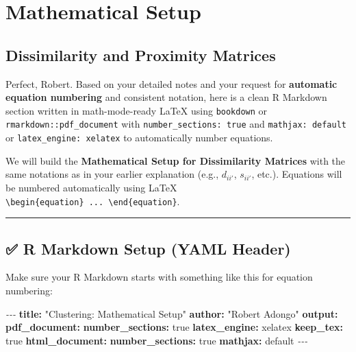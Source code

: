 \documentclass[
]{article}
\newenvironment{Shaded}{\begin{snugshade}}{\end{snugshade}}
\newcommand{\AttributeTok}[1]{\textcolor[rgb]{0.13,0.29,0.53}{#1}}
\newcommand{\CharTok}[1]{\textcolor[rgb]{0.31,0.60,0.02}{#1}}
\newcommand{\FunctionTok}[1]{\textcolor[rgb]{0.13,0.29,0.53}{\textbf{#1}}}
\newcommand{\KeywordTok}[1]{\textcolor[rgb]{0.13,0.29,0.53}{\textbf{#1}}}
\newcommand{\PreprocessorTok}[1]{\textcolor[rgb]{0.56,0.35,0.01}{\textit{#1}}}
\newcommand{\StringTok}[1]{\textcolor[rgb]{0.31,0.60,0.02}{#1}}
\begin{document}
\hypertarget{mathematical-setup}{%
\section{Mathematical Setup}\label{mathematical-setup}}

\hypertarget{dissimilarity-and-proximity-matrices}{%
\subsection{Dissimilarity and Proximity
Matrices}\label{dissimilarity-and-proximity-matrices}}

Perfect, Robert. Based on your detailed notes and your request for
\textbf{automatic equation numbering} and consistent notation, here is a
clean R Markdown section written in math-mode-ready LaTeX using
\texttt{bookdown} or \texttt{rmarkdown::pdf\_document} with
\texttt{number\_sections:\ true} and \texttt{mathjax:\ default} or
\texttt{latex\_engine:\ xelatex} to automatically number equations.

We will build the \textbf{Mathematical Setup for Dissimilarity Matrices}
with the same notations as in your earlier explanation (e.g.,
\(d_{ii'}\), \(s_{ii'}\), etc.). Equations will be numbered
automatically using LaTeX
\texttt{\textbackslash{}begin\{equation\}\ ...\ \textbackslash{}end\{equation\}}.

\begin{center}\rule{0.5\linewidth}{0.5pt}\end{center}

\hypertarget{r-markdown-setup-yaml-header}{%
\subsection{✅ R Markdown Setup (YAML
Header)}\label{r-markdown-setup-yaml-header}}

Make sure your R Markdown starts with something like this for equation
numbering:

\begin{Shaded}
\begin{Highlighting}[]
\PreprocessorTok{{-}{-}{-}}
\FunctionTok{title}\KeywordTok{:}\AttributeTok{ }\StringTok{"Clustering: Mathematical Setup"}
\FunctionTok{author}\KeywordTok{:}\AttributeTok{ }\StringTok{"Robert Adongo"}
\FunctionTok{output}\KeywordTok{:}
\AttributeTok{  }\FunctionTok{pdf\_document}\KeywordTok{:}
\AttributeTok{    }\FunctionTok{number\_sections}\KeywordTok{:}\AttributeTok{ }\CharTok{true}
\AttributeTok{    }\FunctionTok{latex\_engine}\KeywordTok{:}\AttributeTok{ xelatex}
\AttributeTok{    }\FunctionTok{keep\_tex}\KeywordTok{:}\AttributeTok{ }\CharTok{true}
\AttributeTok{  }\FunctionTok{html\_document}\KeywordTok{:}
\AttributeTok{    }\FunctionTok{number\_sections}\KeywordTok{:}\AttributeTok{ }\CharTok{true}
\AttributeTok{    }\FunctionTok{mathjax}\KeywordTok{:}\AttributeTok{ default}
\PreprocessorTok{{-}{-}{-}}
\end{Highlighting}
\end{Shaded}
\end{document}
